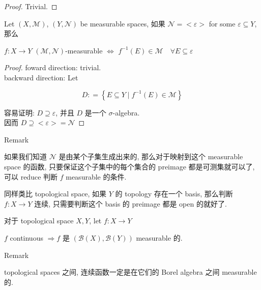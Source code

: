 \documentclass{qlnotes-export}
\begin{document}
\begin{proof}

Trivial.

\end{proof}

\begin{lemma}

Let \((X,\mathcal{M})\), \((Y,\mathcal{N})\) be measurable spaces, 如果 \(\mathcal{N} = < \varepsilon >\) for some \(\varepsilon \subseteq Y\), 那么

\(f:X\rightarrow Y\) \((\mathcal{M},\mathcal{N})\)-measurable \(\Leftrightarrow\) \(f^{- 1}(E) \in \mathcal{M}\quad\forall E \subseteq \varepsilon\)

\end{lemma}

\begin{proof}

foward direction: trivial.\\
backward direction: Let

\[D: = \left\{ {E \subseteq Y \mid f^{- 1}(E) \in \mathcal{M}} \right\}\]

容易证明: \(D \supseteq \varepsilon\), 并且 \(D\) 是一个 \(\sigma\)-algebra.\\
因而 \(D \supseteq < \varepsilon > = \mathcal{N}\)

\end{proof}

\begin{qlremark}{Remark}

如果我们知道 \(\mathcal{N}\) 是由某个子集生成出来的, 那么对于映射到这个 measurable space 的函数, 只要保证这个子集中的每个集合的 preimage 都是可测集就可以了, 可以 reduce 判断 \(f\) measurable 的条件.

同样类比 topological space, 如果 \(Y\) 的 topology 存在一个 basis, 那么判断 \(f:X\rightarrow Y\) 连续, 只需要判断这个 basis 的 preimage 都是 open 的就好了.

\end{qlremark}

\begin{proposition}

对于 topological space \(X,Y\), let \(f:X\rightarrow Y\)

\(f\) continuous \(\Longrightarrow\)\(f\) 是 \((\mathcal{B}(X),\mathcal{B}(Y))\) measurable 的.

\end{proposition}

\begin{qlremark}{Remark}

topological spaces 之间, 连续函数一定是在它们的 Borel algebra 之间 measurable 的.

\end{qlremark}
\end{document}
